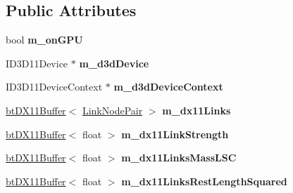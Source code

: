 \subsection*{Public Attributes}
\begin{DoxyCompactItemize}
\item 
\hypertarget{classbt_soft_body_link_data_d_x11_a1a501b4687c49c9d3f06998b9326b738}{bool {\bfseries m\+\_\+on\+G\+P\+U}}\label{classbt_soft_body_link_data_d_x11_a1a501b4687c49c9d3f06998b9326b738}

\item 
\hypertarget{classbt_soft_body_link_data_d_x11_a5165fec28f87075b0c86fd799a136017}{I\+D3\+D11\+Device $\ast$ {\bfseries m\+\_\+d3d\+Device}}\label{classbt_soft_body_link_data_d_x11_a5165fec28f87075b0c86fd799a136017}

\item 
\hypertarget{classbt_soft_body_link_data_d_x11_aef3e52e6770b611847be5fe00cf7afc0}{I\+D3\+D11\+Device\+Context $\ast$ {\bfseries m\+\_\+d3d\+Device\+Context}}\label{classbt_soft_body_link_data_d_x11_aef3e52e6770b611847be5fe00cf7afc0}

\item 
\hypertarget{classbt_soft_body_link_data_d_x11_ab6d97568b50c977f3981fa3a4215f156}{\hyperlink{classbt_d_x11_buffer}{bt\+D\+X11\+Buffer}$<$ \hyperlink{classbt_soft_body_link_data_1_1_link_node_pair}{Link\+Node\+Pair} $>$ {\bfseries m\+\_\+dx11\+Links}}\label{classbt_soft_body_link_data_d_x11_ab6d97568b50c977f3981fa3a4215f156}

\item 
\hypertarget{classbt_soft_body_link_data_d_x11_aff35b6def109554bf9152c859d11de8c}{\hyperlink{classbt_d_x11_buffer}{bt\+D\+X11\+Buffer}$<$ float $>$ {\bfseries m\+\_\+dx11\+Link\+Strength}}\label{classbt_soft_body_link_data_d_x11_aff35b6def109554bf9152c859d11de8c}

\item 
\hypertarget{classbt_soft_body_link_data_d_x11_aeafdfe8fe3b24d22a897c1c524a5da2f}{\hyperlink{classbt_d_x11_buffer}{bt\+D\+X11\+Buffer}$<$ float $>$ {\bfseries m\+\_\+dx11\+Links\+Mass\+L\+S\+C}}\label{classbt_soft_body_link_data_d_x11_aeafdfe8fe3b24d22a897c1c524a5da2f}

\item 
\hypertarget{classbt_soft_body_link_data_d_x11_a236a04e93b93a25059520fc3930a8b4a}{\hyperlink{classbt_d_x11_buffer}{bt\+D\+X11\+Buffer}$<$ float $>$ {\bfseries m\+\_\+dx11\+Links\+Rest\+Length\+Squared}}\label{classbt_soft_body_link_data_d_x11_a236a04e93b93a25059520fc3930a8b4a}


\end{DoxyCompactItemize}
